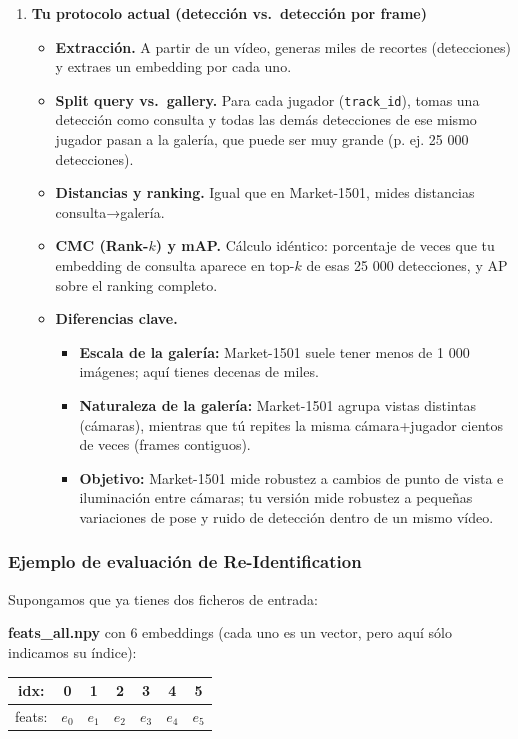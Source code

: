 \documentclass[12pt, a4paper, twoside]{article}
\begin{document}
\begin{enumerate}
 		\item \textbf{Tu protocolo actual (detección vs.\ detección por frame)}
 		\begin{itemize}
 			\item \textbf{Extracción.}  
 			A partir de un vídeo, generas miles de recortes (detecciones) y extraes un embedding por cada uno.
 			\item \textbf{Split query vs.\ gallery.}  
 			Para cada jugador (\texttt{track\_id}), tomas una detección como consulta y todas las demás detecciones de ese mismo jugador pasan a la galería, que puede ser muy grande (p. ej. 25 000 detecciones).
 			\item \textbf{Distancias y ranking.}  
 			Igual que en Market-1501, mides distancias consulta→galería.
 			\item \textbf{CMC (Rank-\(k\)) y mAP.}  
 			Cálculo idéntico: porcentaje de veces que tu embedding de consulta aparece en top-\(k\) de esas 25 000 detecciones, y AP sobre el ranking completo.
 			\item \textbf{Diferencias clave.}
 			\begin{itemize}
 				\item \textbf{Escala de la galería:} Market-1501 suele tener menos de 1 000 imágenes; aquí tienes decenas de miles.
 				\item \textbf{Naturaleza de la galería:} Market-1501 agrupa vistas distintas (cámaras), mientras que tú repites la misma cámara+jugador cientos de veces (frames contiguos).
 				\item \textbf{Objetivo:} Market-1501 mide robustez a cambios de punto de vista e iluminación entre cámaras; tu versión mide robustez a pequeñas variaciones de pose y ruido de detección dentro de un mismo vídeo.
 			\end{itemize}
 		\end{itemize}
 	\end{enumerate}
 	
 	\subsubsection{Ejemplo de evaluación de Re-Identification}
 	
 	Supongamos que ya tienes dos ficheros de entrada:
 	
 	\medskip
 	\noindent
 	\textbf{feats\_all.npy} con 6 embeddings (cada uno es un vector, pero aquí sólo indicamos su índice):
 	\begin{center}
 		\begin{tabular}{c|cccccc}
 			idx:   & 0 & 1 & 2 & 3 & 4 & 5 \\ \hline
 			feats: & $e_0$ & $e_1$ & $e_2$ & $e_3$ & $e_4$ & $e_5$
 		\end{tabular}
 	\end{center}
 	
\end{document}
